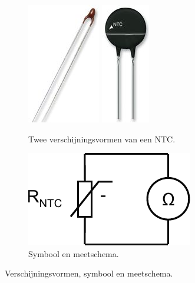 \documentclass[12pt,a4paper,final,twoside,fleqn]{article}
\begin{document}
\begin{figure}[ht!]
\begin{subfigure}[c]{0.48\textwidth}
\centering
\includegraphics[scale=0.25]{pics/thermistor1}\hspace*{1cm}
\includegraphics[scale=0.25]{pics/thermistor2}
\caption[Een NTC]{Twee verschijningsvormen van een NTC.}
\label{fig:thermistor1}
\end{subfigure}
\begin{subfigure}[c]{0.48\textwidth}
\centering
\includegraphics[scale=0.63]{drawings/ntc_symbol_meas}
\caption[Een NTC]{Symbool en meetschema.}
\label{fig:ntc_symbol_meas}
\end{subfigure}
\caption{Verschijningsvormen, symbool en meetschema.}
\label{fig:ntcpics}
\end{figure}%
\end{document}
